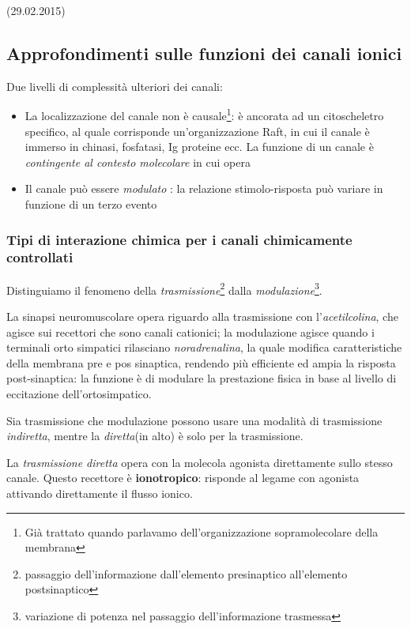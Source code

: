 \documentclass[a4paper,12pt]{article}
\begin{document}
(29.02.2015)
\subsection{Approfondimenti sulle funzioni dei canali ionici}

Due livelli di complessità ulteriori dei canali:
\begin{itemize}
\item{La localizzazione del canale non è causale\footnote{Già trattato quando parlavamo dell'organizzazione sopramolecolare della membrana}: è ancorata ad un citoscheletro specifico, al quale corrisponde un'organizzazione Raft, in cui il canale è immerso in chinasi, fosfatasi, Ig proteine ecc. La funzione di un canale è \emph{contingente al contesto molecolare} in cui opera}
\item{Il canale può essere \emph{modulato} : la relazione stimolo-risposta può variare in funzione di un terzo evento}
\end{itemize}

\subsubsection{Tipi di interazione chimica per i canali chimicamente controllati}
Distinguiamo il fenomeno della \emph{trasmissione}\footnote{passaggio dell'informazione dall'elemento presinaptico all'elemento postsinaptico} dalla \emph{modulazione}\footnote{variazione di potenza nel passaggio dell'informazione trasmessa}.

La sinapsi neuromuscolare opera riguardo alla trasmissione con l'\emph{acetilcolina}, che agisce sui recettori che sono canali cationici; la modulazione agisce quando i terminali orto simpatici rilasciano \emph{noradrenalina}, la quale modifica caratteristiche della membrana pre e pos sinaptica, rendendo più efficiente ed ampia la risposta post-sinaptica: la funzione è di modulare la prestazione fisica in base al livello di eccitazione dell'ortosimpatico.

Sia trasmissione che modulazione possono usare una modalità di trasmissione \emph{indiretta}, mentre la \emph{diretta}(in alto) è solo per la trasmissione. 

La \emph{trasmissione diretta} opera con la molecola agonista direttamente sullo stesso canale. Questo recettore è \textbf{ionotropico}: risponde al legame con agonista attivando direttamente il flusso ionico.
\end{document}
